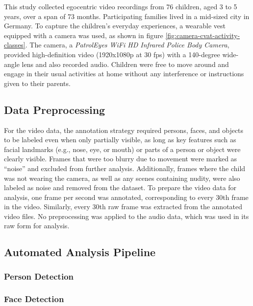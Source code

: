\documentclass[
  man,floatsintext]{apa6}
\begin{document}
This study collected egocentric video recordings from 76 children, aged 3 to 5 years, over a span of 73 months. Participating families lived in a mid-sized city in Germany. To capture the children's everyday experiences, a wearable vest equipped with a camera was used, as shown in figure \ref{fig:camera-cvat-activity-classes}. The camera, a \emph{PatrolEyes WiFi HD Infrared Police Body Camera}, provided high-definition video (1920x1080p at 30 fps) with a 140-degree wide-angle lens and also recorded audio. Children were free to move around and engage in their usual activities at home without any interference or instructions given to their parents.

\subsection{Data Preprocessing}\label{data-preprocessing}

For the video data, the annotation strategy required persons, faces, and objects to be labeled even when only partially visible, as long as key features such as facial landmarks (e.g., nose, eye, or mouth) or parts of a person or object were clearly visible. Frames that were too blurry due to movement were marked as ``noise'' and excluded from further analysis. Additionally, frames where the child was not wearing the camera, as well as any scenes containing nudity, were also labeled as noise and removed from the dataset. To prepare the video data for analysis, one frame per second was annotated, corresponding to every 30th frame in the video. Similarly, every 30th raw frame was extracted from the annotated video files. No preprocessing was applied to the audio data, which was used in its raw form for analysis.

\subsection{Automated Analysis Pipeline}\label{automated-analysis-pipeline}

\subsubsection{Person Detection}\label{person-detection}

\subsubsection{Face Detection}\label{face-detection}
\end{document}
